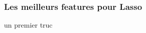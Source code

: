 \begin{frame}[allowframebreaks]
\frametitle{Les meilleurs features pour Lasso}
    un premier truc

    \framebreak
\end{frame}